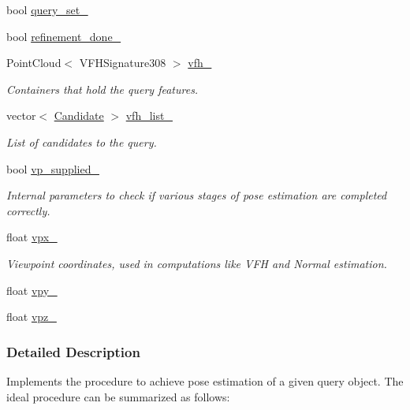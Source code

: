 \begin{DoxyCompactItemize}
bool \hyperlink{classPoseEstimation_a7e544a41181063a42466cab3bdaf7566}{query\-\_\-set\-\_\-}
\item 
bool \hyperlink{classPoseEstimation_a2a2d2fea36860191501e5b709df102cc}{refinement\-\_\-done\-\_\-}
\item 
Point\-Cloud$<$ V\-F\-H\-Signature308 $>$ \hyperlink{classPoseEstimation_aa5b8629653546950dfc66147f3df29a7}{vfh\-\_\-}
\begin{DoxyCompactList}\small\item\em Containers that hold the query features. \end{DoxyCompactList}\item 
vector$<$ \hyperlink{classCandidate}{Candidate} $>$ \hyperlink{classPoseEstimation_ac75bed8cd5eea4f58b3c68336801977a}{vfh\-\_\-list\-\_\-}
\begin{DoxyCompactList}\small\item\em List of candidates to the query. \end{DoxyCompactList}\item 
bool \hyperlink{classPoseEstimation_a1e1d26efa152cca49892e2458f0e5842}{vp\-\_\-supplied\-\_\-}
\begin{DoxyCompactList}\small\item\em Internal parameters to check if various stages of pose estimation are completed correctly. \end{DoxyCompactList}\item 
float \hyperlink{classPoseEstimation_ab9e6a36597bef9a8f3a831423bdae1c9}{vpx\-\_\-}
\begin{DoxyCompactList}\small\item\em Viewpoint coordinates, used in computations like V\-F\-H and Normal estimation. \end{DoxyCompactList}\item 
float \hyperlink{classPoseEstimation_a1511fe49165c547efae9bed1b2353d07}{vpy\-\_\-}
\item 
float \hyperlink{classPoseEstimation_a49696bc81ba72d1b0e985aa8318b0a82}{vpz\-\_\-}
\end{DoxyCompactItemize}


\subsubsection{Detailed Description}
Implements the procedure to achieve pose estimation of a given query object. The ideal procedure can be summarized as follows\-: 



